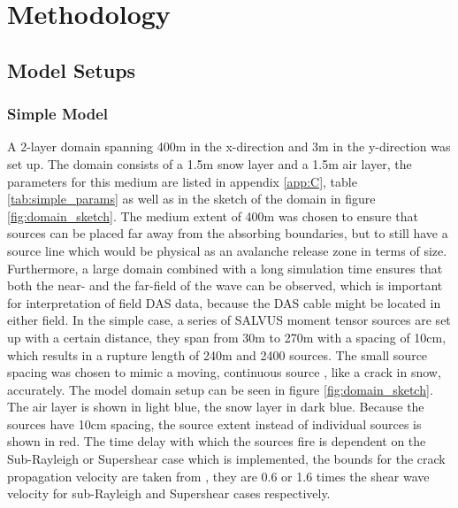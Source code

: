 \chapter{Methodology}
\label{chap:methodology}
%
%

\section{Model Setups}
\label{sec:model_setups}

\subsection{Simple Model}
\label{sec:simple_model}
A 2-layer domain spanning 400m in the x-direction and 3m in the y-direction was set up. The domain consists of a 1.5m snow layer and a 1.5m air layer, the parameters for this medium are listed in appendix \ref{app:C}, table \ref{tab:simple_params} as well as in the sketch of the domain in figure \ref{fig:domain_sketch}. The medium extent of 400m was chosen to ensure that sources can be placed far away from the absorbing boundaries, but to still have a source line which would be physical as an avalanche release zone in terms of size. Furthermore, a large domain combined with a long simulation time ensures that both the near- and the far-field of the wave can be observed, which is important for interpretation of field DAS data, because the DAS cable might be located in either field. In the simple case, a series of SALVUS moment tensor sources are set up with a certain distance, they span from 30m to 270m with a spacing of 10cm, which results in a rupture length of 240m and 2400 sources. The small source spacing was chosen to mimic a moving, continuous source \parencite{madariagaDynamicsExpandingCircular1976}, like a crack in snow, accurately. The model domain setup can be seen in figure \ref{fig:domain_sketch}. The air layer is shown in light blue, the snow layer in dark blue. Because the sources have 10cm spacing, the source extent instead of individual sources is shown in red. The time delay with which the sources fire is dependent on the Sub-Rayleigh or Supershear case which is implemented, the bounds for the crack propagation velocity are taken from \cite{trottetTransitionSubRayleighAnticrack2022}, they are 0.6 or 1.6 times the shear wave velocity for sub-Rayleigh and Supershear cases respectively.\par

